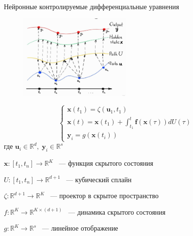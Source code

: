 \documentclass[10pt,pdf,hyperref={unicode}]{beamer}
\newcommand{\bx}{\mathbf{x}}
\newcommand{\by}{\mathbf{y}}
\newcommand{\bff}{\mathbf{f}}
\newcommand{\bu}{\mathbf{u}}
\newcommand{\dR}{\mathds{R}}
\begin{document}
\begin{frame}{Нейронные контролируемые дифференциальные уравнения}
	\begin{multicols}{2}
		\begin{figure}
			\includegraphics[width=0.5\textwidth]{neural-cde-path.jpg}
		\end{figure}
	
		\begin{equation*}
			\begin{cases}
				\bx(t_1) = \zeta(\bu_1, t_1) \\
				\bx(t) = \bx(t_1) + \int_{t_1}^t \bff(\bx(\tau))dU(\tau) \\
				\by_i = g(\bx(t_i))
			\end{cases}
		\end{equation*}
		$\text{где } \bu_i \in \dR^d, \; \by_i \in \dR^s $
		
		$\bx: [t_1, t_n] \rightarrow \dR^K$ ~--- функция скрытого состояния
		
		$U: [t_1, t_n] \rightarrow \dR^{d+1}$ ~--- кубический сплайн 
		
		$\zeta: \dR^{d+1} \rightarrow \dR^K$ ~--- проектор в скрытое пространство
		
		$f: \dR^K \rightarrow \dR^{K \times (d+1)}$ ~--- динамика скрытого состояния
		
		$g: \dR^K \rightarrow \dR^s$ ~--- линейное отображение
	\end{multicols}
\end{frame}
\end{document}
